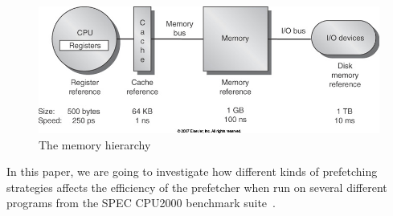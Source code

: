 \begin{figure}[H]
	\centering
	\includegraphics[scale=0.3]{./img/mem_hier}
	\caption{The memory hierarchy}
	\label{img:mem_hier}
\end{figure}

In this paper, we are going to investigate how different kinds of
prefetching strategies affects the efficiency of the prefetcher when
run on several different programs from the SPEC CPU2000 benchmark
suite~\cite{SPECFAQ}.

